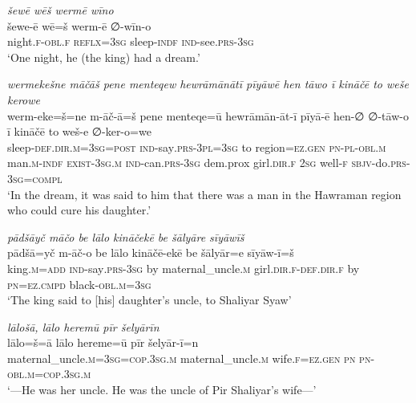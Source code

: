 \ea \label{ŽP.153}
\textit{šewē wēš wermē wīno} \\ 
\gll šewe-ē wē=š werm-ē ∅-wīn-o \\ 
 night\textsc{.f}\textsc{-obl}\textsc{.f} \textsc{reflx}\textsc{=3sg} sleep\textsc{-indf} \textsc{ind-}see\textsc{.prs}\textsc{-3sg} \\ 
\glt `One night, he (the king) had a dream.'
\z 
 
\ea \label{ŽP.154}
\textit{wermekešne māčāš pene menteqew hewrāmānātī pīyāwē hen tāwo ī kināčē to weše kerowe} \\ 
\gll werm-eke=š=ne m-āč-ā=š pene menteqe=ū hewrāmān-āt-ī pīyā-ē hen-∅ ∅-tāw-o ī kināčē to weš-e ∅-ker-o=we \\ 
 sleep\textsc{-def}\textsc{.dir}\textsc{.m}\textsc{=3sg}\textsc{=\textsc{post}} \textsc{ind-}say\textsc{.prs}\textsc{-3pl}\textsc{=3sg} to region=\textsc{ez.gen} \textsc{pn}\textsc{\textsc{-pl}}\textsc{-obl}\textsc{.m} man\textsc{.m}\textsc{-indf} \textsc{exist}\textsc{-3sg}\textsc{.m} \textsc{ind-}can\textsc{.prs}\textsc{-3sg} dem.prox girl\textsc{.dir}\textsc{.f} \textsc{2sg} well\textsc{-f} \textsc{sbjv-}do\textsc{.prs}\textsc{-3sg}\textsc{=compl} \\ 
\glt `In the dream, it was said to him that there was a man in the Hawraman region who could cure his daughter.'
\z 
 
\ea \label{ŽP.157}
\textit{pādšāyč māčo be lālo kināčekē be šālyāre sīyāwīš} \\ 
\gll pādšā=yč m-āč-o be lālo kināčē-ekē be šālyār=e sīyāw-ī=š \\ 
 king\textsc{.m}\textsc{=add} \textsc{ind-}say\textsc{.prs}\textsc{-3sg} by maternal\_uncle\textsc{.m} girl\textsc{.dir}\textsc{.f}\textsc{-def}\textsc{.dir}\textsc{.f} by \textsc{pn}\textsc{=ez}\textsc{.cmpd} black\textsc{-obl}\textsc{.m}\textsc{=3sg} \\ 
\glt `The king said to [his] daughter’s uncle, to Shaliyar Syaw'
\z 
 
\ea \label{ŽP.158}
\textit{lālošā, lālo heremū pīr šelyārīn} \\ 
\gll lālo=š=ā lālo hereme=ū pīr šelyār-ī=n \\ 
 maternal\_uncle\textsc{.m}\textsc{=3sg}\textsc{=cop}\textsc{.3sg}\textsc{.m} maternal\_uncle\textsc{.m} wife\textsc{.f}\textsc{\textsc{=ez.gen}} \textsc{pn} \textsc{pn}\textsc{-obl}\textsc{.m}\textsc{=cop}\textsc{.3sg}\textsc{.m} \\ 
\glt `—He was her uncle. He was the uncle of Pir Shaliyar’s wife—'
\z 
 
